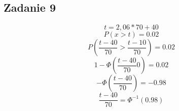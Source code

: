 \subsection{Zadanie 9}
$$t=2,06*70+40$$
$$P(x>t)=0.02$$         
$$P(\frac{t-40}{70}>\frac{t-10}{70})=0.02$$
$$1-\Phi(\frac{t-40}{70}0)=0.02$$
$$-\Phi(\frac{t-40}{70})=-0.98$$
$$\frac{t-40}{70}={\Phi^{-1}}(0.98)$$

